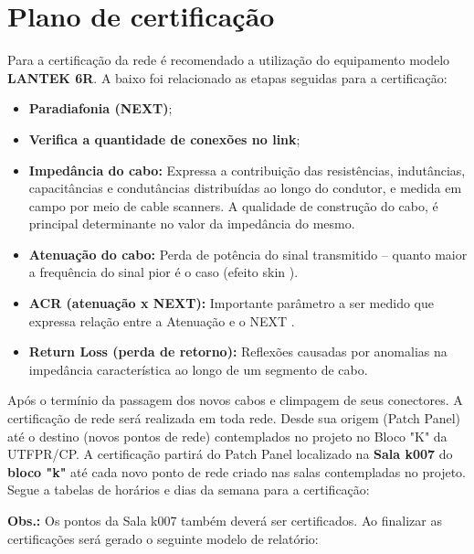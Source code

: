 \documentclass[	DIV=calc,%
paper=a4,%
fontsize=12pt,%
onecolumn]{scrartcl}	 					%
\begin{document}
	\section{Plano de certificação}	
	Para a certificação da rede é recomendado a utilização do equipamento modelo \textbf{LANTEK 6R}. 
	A baixo foi relacionado as etapas seguidas para a certificação:
	\begin{itemize}
		\item \textbf{Paradiafonia (NEXT)};
		\item \textbf{Verifica a quantidade de conexões no link};
		\item \textbf{Impedância do cabo:} Expressa a contribuição das resistências, indutâncias, capacitâncias e condutâncias distribuídas ao longo do condutor, e medida em campo por meio de cable scanners. A qualidade de construção do cabo, é principal determinante no valor da impedância do mesmo.
		\item \textbf{Atenuação do cabo:} Perda de potência do sinal transmitido – quanto maior a frequência do sinal pior é o caso (efeito skin ).
		\item \textbf{ACR (atenuação x NEXT):} Importante parâmetro a ser medido que expressa relação entre a Atenuação e o NEXT .
		\item \textbf{Return Loss (perda de retorno):} Reflexões causadas por anomalias na impedância característica ao longo de um segmento de cabo.
	\end{itemize}
	Após o termínio da passagem dos novos cabos e climpagem de seus conectores. A certificação de rede será realizada em toda rede. Desde sua origem (Patch Panel) até o destino (novos pontos de rede) contemplados no projeto no Bloco "K" da UTFPR/CP. 
	A certificação partirá do Patch Panel localizado na \textbf{Sala k007} do \textbf{bloco "k"} até cada novo ponto de rede criado nas salas contempladas no projeto. 
	Segue a tabelas de horários e dias da semana para a certificação:
	
	\textbf{Obs.:} Os pontos da Sala k007 também deverá ser certificados.
	Ao finalizar as certificações será gerado o seguinte modelo de relatório:
\end{document}
